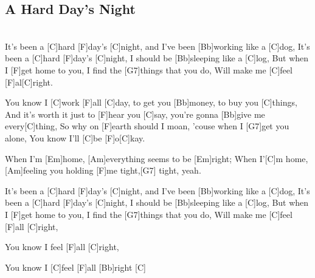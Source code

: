 \subsection{A Hard Day's Night}

\begin{guitar}
\\
It's been a [C]{hard} [F]{day's} [C]{night}, and I've been [Bb]{work}ing like a [C]{dog},
It's been a [C]{hard} [F]{day's} [C]{night}, I should be [Bb]{sleep}ing like a [C]{log},
But when I [F]{get} home to you, I find the [G7]{things} that you do, 
Will make me [C]{feel} [F]{al}[C]{right}.


You know I [C]{work} [F]{all} [C]{day}, to get you [Bb]{mon}ey, to buy you [C]{things},
And it's worth it just to [F]{hear} you [C]{say}, you're gonna [Bb]{give} me every[C]{thing},
So why on [F]{earth} should I moan, 'couse when I [G7]{get} you alone, 
You know I'll [C]{be} [F]{o}[C]{kay}.


When I'm [Em]{home},  [Am]{ev}erything seems to be [Em]{right};
When I'[C]{m} home, [Am]{fe}eling you holding [F]{me} tight,[G7]{ }tight, yeah.


It's been a [C]{hard} [F]{day's} [C]{night}, and I've been [Bb]{work}ing like a [C]{dog},
It's been a [C]{hard} [F]{day's} [C]{night}, I should be [Bb]{sleep}ing like a [C]{log},
But when I [F]{get} home to you, I find the [G7]{things} that you do,
Will make me [C]{feel} [F]{all} [C]{right},


You know I feel [F]{all} [C]{right},


You know I [C]{feel} [F]{all} [Bb]{right}      [C]{}

\end{guitar}
